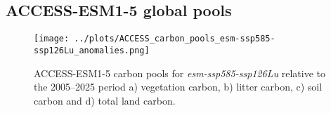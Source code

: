 \documentclass[]{article}
\begin{document}

\subsection{ACCESS-ESM1-5 global pools}

\begin{figure}[H]
    \centering
    \texttt{[image: ../plots/ACCESS\_carbon\_pools\_esm-ssp585-ssp126Lu\_anomalies.png]}
    \caption{ACCESS-ESM1-5 carbon pools for \textit{esm-ssp585-ssp126Lu} relative to the 2005--2025 period a) vegetation carbon, b) litter carbon, c) soil carbon and d) total land carbon.}
    \label{fig:access_cpools}
\end{figure}
\end{document}
